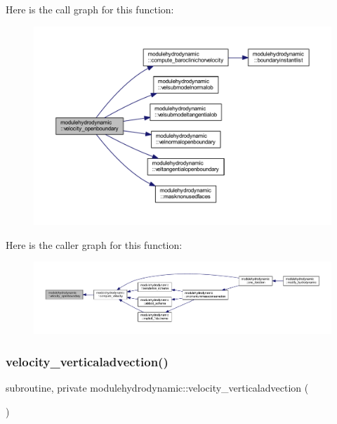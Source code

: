 Here is the call graph for this function\+:\nopagebreak
\begin{figure}[H]
\begin{center}
\leavevmode
\includegraphics[width=350pt]{namespacemodulehydrodynamic_ad3f40e56e615a729156e48c10775bde3_cgraph}
\end{center}
\end{figure}
Here is the caller graph for this function\+:\nopagebreak
\begin{figure}[H]
\begin{center}
\leavevmode
\includegraphics[width=350pt]{namespacemodulehydrodynamic_ad3f40e56e615a729156e48c10775bde3_icgraph}
\end{center}
\end{figure}
\mbox{\label{namespacemodulehydrodynamic_ac07b9cc801de5e329ae0bf6d2bc4783b}} 
\subsubsection{\texorpdfstring{velocity\+\_\+verticaladvection()}{velocity\_verticaladvection()}}
{\footnotesize\ttfamily subroutine, private modulehydrodynamic\+::velocity\+\_\+verticaladvection (\begin{DoxyParamCaption}{ }\end{DoxyParamCaption})\hspace{0.3cm}{\ttfamily [private]}}

